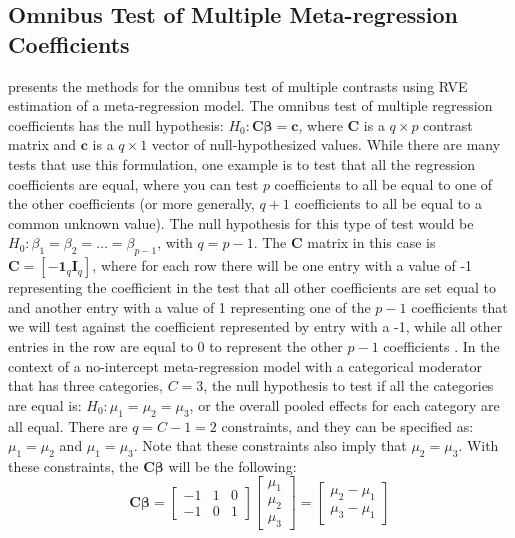 \subsection{Omnibus Test of Multiple Meta-regression Coefficients}



\textcite{tipton2015b} presents the methods for the omnibus test of multiple contrasts using RVE estimation of a meta-regression model. The omnibus test of multiple regression coefficients has the null hypothesis:
$H_0: \mathbf{C}\bm{\beta} = \mathbf{c}$, where $\mathbf{C}$ is a $q \times p$ contrast matrix and $\mathbf{c}$ is a $q \times 1$ vector of null-hypothesized values. While there are many tests that use this formulation, one example is to test that all the regression coefficients are equal, where you can test $p$ coefficients to all be equal to one of the other coefficients (or more generally, $q+1$ coefficients to all be equal to a common unknown value). The null hypothesis for this type of test would be $H_0: \beta_1 = \beta_2 = \dots = \beta_{p-1}$, with $q = p - 1$. The $\mathbf{C}$ matrix in this case is $\mathbf{C} = [-\mathbf{1}_{q}\mathbf{I}_q]$, where for each row there will be one entry with a value of -1 representing the coefficient in the test that all other coefficients are set equal to and another entry with a value of 1 representing one of the $p-1$ coefficients that we will test against the coefficient represented by entry with a -1, while all other entries in the row are equal to 0 to represent the other $p-1$ coefficients  \autocite{tipton2015b, pustejovsky_wald_2025}. In the context of a no-intercept meta-regression model with a categorical moderator that has three categories, $ C=3$, the null hypothesis to test if all the categories are equal is: $H_0: \mu_1 = \mu_2 = \mu_3$, or the overall pooled effects for each category are all equal. There are $q = C-1 = 2$ constraints, and they can be specified as: $\mu_1 = \mu_2$ and $\mu_1 = \mu_3$. Note that these constraints also imply that $\mu_2 = \mu_3$. With these constraints, the $\mathbf{C}\bm{\beta}$ will be the following:
\begin{equation}
\mathbf{C}\bm{\beta} =
    \begin{bmatrix}
        -1 & 1 & 0 \\
        -1 & 0 & 1
    \end{bmatrix} \begin{bmatrix}
        \mu_1 \\
        \mu_2 \\
        \mu_3
    \end{bmatrix} =
    \begin{bmatrix}
        \mu_2 - \mu_1 \\
        \mu_3 - \mu_1
    \end{bmatrix}
\end{equation}
